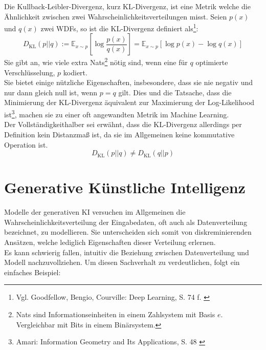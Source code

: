 Die Kullback-Leibler-Divergenz, kurz KL-Divergenz, ist eine Metrik welche die Ähnlichkeit zwischen zwei Wahrscheinlichkeitsverteilungen misst. Seien $p(x)$ und $q(x)$ zwei WDFs, so ist die KL-Divergenz definiert als\footnote{
    Vgl. Goodfellow, Bengio, Courville: Deep Learning, S. 74 f.
    \cite{Goodfellow-et-al-2016}
}:
\begin{equation}
    D_\text{KL}(p||q) 
    := \mathbb{E}_{x \sim p} \left [
    \log \frac{p(x)} {q(x)}
    \right ]
    = \mathbb{E}_{x \sim p} \left [ 
        \log p(x) - \log q(x)
        \right ]
\end{equation}
Sie gibt an, wie viele extra Nats\footnote{
    Nats sind Informationseinheiten in einem Zahlsystem mit Basis $e$. Vergleichbar mit Bits in einem Binärsystem. 
} nötig sind, wenn eine für $q$ optimierte Verschlüsselung, $p$ kodiert. \\
Sie bietet einige nützliche Eigenschaften, insbesondere, dass sie nie negativ und nur dann gleich null ist, wenn $p = q$ gilt. Dies und die Tatsache, dass die Minimierung der KL-Divergenz äquivalent zur Maximierung der Log-Likelihood ist\footnote{
    Amari: Information Geometry and Its Applications, S. 48
    \cite{10.5555/3019383}
}, machen sie zu einer oft angewandten Metrik im Machine Learning. \\
Der Vollständigkeithalber sei erwähnt, dass die KL-Divergenz allerdings per Definition kein Distanzmaß ist, da sie im Allgemeinen keine kommutative Operation ist.  
\begin{equation}
    D_\text{KL}(p||q) \ne D_\text{KL}(q||p) 
\end{equation}



\section{Generative Künstliche Intelligenz}

Modelle der generativen KI versuchen im Allgemeinen die Wahrscheinlichkeitsverteilung der Eingabedaten, oft auch als Datenverteilung bezeichnet, zu modellieren. Sie unterscheiden sich somit von diskreminierenden Ansätzen, welche lediglich Eigenschaften dieser Verteilung erlernen. \\
Es kann schwierig fallen, intuitiv die Beziehung zwischen Datenverteilung und Modell nachzuvollziehen. Um diesen Sachverhalt zu verdeutlichen, folgt ein einfaches Beispiel:


